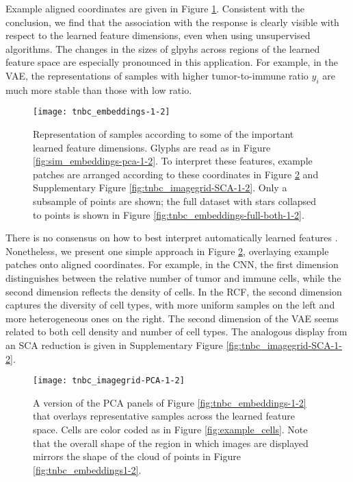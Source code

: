 Example aligned coordinates are given in Figure
\ref{fig:tnbc_important_features}. Consistent with the conclusion, we find that
the association with the response is clearly visible with respect to the learned
feature dimensions, even when using unsupervised algorithms. The changes in the
sizes of glpyhs across regions of the learned feature space are especially
pronounced in this application. For example, in the VAE, the representations of
samples with higher tumor-to-immune ratio $y_i$ are much more stable than those
with low ratio.

\begin{figure}
  \centering
  \texttt{[image: tnbc\_embeddings-1-2]}
  \caption{Representation of samples according to some of the important learned
    feature dimensions. Glyphs are read as in Figure
    \ref{fig:sim_embeddings-pca-1-2}. To interpret these features, example
    patches are arranged according to these coordinates in Figure
    \ref{fig:tnbc_imagegrid-PCA-1-2} and Supplementary Figure
    \ref{fig:tnbc_imagegrid-SCA-1-2}. Only a subsample of points are shown; the
    full dataset with stars collapsed to points is shown in Figure
    \ref{fig:tnbc_embeddings-full-both-1-2}.}
  \label{fig:tnbc_important_features}
\end{figure}

There is no consensus on how to best interpret automatically learned features
\citep{doshi2017towards}. Nonetheless, we present one simple approach in Figure
\ref{fig:tnbc_imagegrid-PCA-1-2}, overlaying example patches onto aligned
coordinates. For example, in the CNN, the first dimension distinguishes between
the relative number of tumor and immune cells, while the second dimension
reflects the density of cells. In the RCF, the second dimension captures the
diversity of cell types, with more uniform samples on the left and more
heterogeneous ones on the right. The second dimension of the VAE seems related
to both cell density and number of cell types. The analogous display from an SCA
reduction is given in Supplementary Figure \ref{fig:tnbc_imagegrid-SCA-1-2}.

\begin{figure}
  \centering
  \texttt{[image: tnbc\_imagegrid-PCA-1-2]}
  \caption{A version of the PCA panels of Figure \ref{fig:tnbc_embeddings-1-2}
    that overlays representative samples across the learned feature space. Cells
    are color coded as in Figure \ref{fig:example_cells}. Note that the overall
    shape of the region in which images are displayed mirrors the shape of the
    cloud of points in Figure \ref{fig:tnbc_embeddings1-2}.}
  \label{fig:tnbc_imagegrid-PCA-1-2}
\end{figure}
